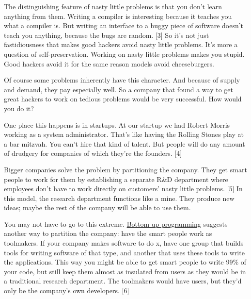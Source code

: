 The distinguishing feature of nasty little
                    problems is that you don't learn anything from them. Writing
                    a compiler is interesting because it teaches you what a
                    compiler is. But writing an interface to a buggy piece of
                    software doesn't teach you anything, because the bugs are
                    random. [3] So it's not just fastidiousness that makes good
                    hackers avoid nasty little problems. It's more a question of
                    self-preservation. Working on nasty little problems makes
                    you stupid. Good hackers avoid it for the same reason models
                    avoid cheeseburgers.

Of course some problems
                    inherently have this character. And because of supply and
                    demand, they pay especially well. So a company that found a
                    way to get great hackers to work on tedious problems would
                    be very successful. How would you do it?

One
                    place this happens is in startups. At our startup we had
                    Robert Morris working as a system administrator. That's like
                    having the Rolling Stones play at a bar mitzvah. You can't
                    hire that kind of talent. But people will do any amount of
                    drudgery for companies of which they're the founders. [4]

Bigger
                    companies solve the problem by partitioning the company.
                    They get smart people to work for them by establishing a
                    separate R\&D department where employees don't have to work
                    directly on customers' nasty little problems. [5] In this
                    model, the research department functions like a mine. They
                    produce new ideas; maybe the rest of the company will be
                    able to use them.

You may not have to go to this
                    extreme.
                    \href{http://www.paulgraham.com/progbot.html}{Bottom-up programming}
                    suggests another way to partition the company: have the
                    smart people work as toolmakers. If your company makes
                    software to do x, have one group that builds tools for
                    writing software of that type, and another that uses these
                    tools to write the applications. This way you might be able
                    to get smart people to write 99\% of your code, but still
                    keep them almost as insulated from users as they would be in
                    a traditional research department. The toolmakers would have
                    users, but they'd only be the company's own developers.
                    [6]


